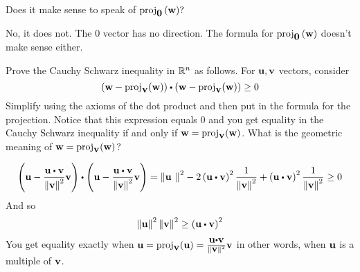 \begin{enumialphparenastyle}
\begin{ex} Does it make sense to speak of $\mbox{\rm proj}_{\mbox{\bf 0}}\left(\mbox{\bf w}\right) ?$
\begin{sol}
No, it does not. The $0$ vector has no direction. The formula for $\mbox{\rm proj}_{\mbox{\bf 0}}\left(\mbox{\bf w}\right)$ doesn't make sense either.
\end{sol}
\end{ex}

\begin{ex} Prove the Cauchy Schwarz inequality in $\mathbb{R}^{n}$ as follows.
For $\mbox{\bf u},\mbox{\bf v}$ vectors, consider 
\begin{equation*}
\tup{\vect{w}-
\func{proj}_{\vect{v}}(\vect{w})} \dotprod \tup{\vect{w}-
\func{proj}_{\vect{v}}(\vect{w})} \geq 0
\end{equation*}
Simplify using the axioms of the dot product and then put in the formula
for the projection. Notice that this expression equals $0$ and you get equality
in the Cauchy Schwarz inequality if and only if 
$\mbox{\bf w}=\mbox{\rm proj}_{\mbox{\bf v}}(\mbox{\bf w})$. What is the geometric meaning of 
$\mbox{\bf w}=\mbox{\rm proj}_{\mbox{\bf v}}(\mbox{\bf w})$?
\begin{sol}
\[
\tup{\vect{u}-\frac{\vect{u}\dotprod \vect{v}}{\norm{\vect{v}}
^{2}}\vect{v}} \dotprod \tup{\vect{u}-\frac{\vect{u}\dotprod \vect{v}}{\norm{\vect{v}} ^{2}}\vect{v}} =\norm{\vect{u
}} ^{2}-2\tup{\vect{u}\dotprod \vect{v}} ^{2}\frac{1}{\norm{
\vect{v}} ^{2}}+\tup{\vect{u}\dotprod \vect{v}} ^{2}\frac{1}{
\norm{\vect{v}} ^{2}}\geq 0
\]
And so
\[
\norm{\vect{u}} ^{2}\norm{\vect{v}}
^{2}\geq \tup{\vect{u}\dotprod \vect{v}} ^{2}
\]
You get equality exactly when $\vect{u}=\func{proj}_{\vect{v}}(\vect{u})
= \frac{\vect{u}\dotprod \vect{v}}{\norm{\vect{v}} ^{2}}\vect{v}$
in other words, when $\mbox{\bf u}$ is a multiple of $\mbox{\bf v}$.
\end{sol}
\end{ex}



\end{enumialphparenastyle}
